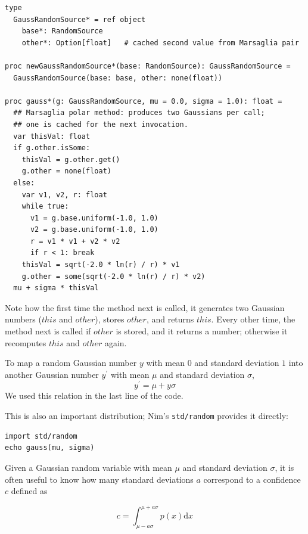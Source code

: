 \documentclass[justified, sixbynine]{tufte-book}
\def\ft{\small\tt}
\theoremstyle{plain}%
\newtheorem * {corollary}{Corollary}
\theoremstyle{definition}
\theoremstyle{remark}
\newtheorem * {remark}{Remark}
\newtheorem * {note}{Note}
\begin{document}
\begin{fullwidth}
\begin{lstlisting}[caption={in file: {\ft nlib/randomgen.nim}}]
type
  GaussRandomSource* = ref object
    base*: RandomSource
    other*: Option[float]   # cached second value from Marsaglia pair

proc newGaussRandomSource*(base: RandomSource): GaussRandomSource =
  GaussRandomSource(base: base, other: none(float))

proc gauss*(g: GaussRandomSource, mu = 0.0, sigma = 1.0): float =
  ## Marsaglia polar method: produces two Gaussians per call;
  ## one is cached for the next invocation.
  var thisVal: float
  if g.other.isSome:
    thisVal = g.other.get()
    g.other = none(float)
  else:
    var v1, v2, r: float
    while true:
      v1 = g.base.uniform(-1.0, 1.0)
      v2 = g.base.uniform(-1.0, 1.0)
      r = v1 * v1 + v2 * v2
      if r < 1: break
    thisVal = sqrt(-2.0 * ln(r) / r) * v1
    g.other = some(sqrt(-2.0 * ln(r) / r) * v2)
  mu + sigma * thisVal
\end{lstlisting}

Note how the first time the method next is called, it generates two Gaussian
numbers ($this$ and $other$), stores $other$, and returns $this$. Every other
time, the method next is called if $other$ is stored, and it returns a number;
otherwise it recomputes $this$ and $other$ again.

To map a random Gaussian number $y$ with mean $0$ and standard deviation $1$
into another Gaussian number $y^{\prime }$ with mean $\mu $ and standard
deviation $\sigma $, 
\begin{equation}
y^{\prime }=\mu +y\sigma
\end{equation}
We used this relation in the last line of the code.

This is also an important distribution; Nim's {\ft std/random} provides it directly:

\begin{lstlisting}
import std/random
echo gauss(mu, sigma)
\end{lstlisting}

Given a Gaussian random variable with mean $\mu$ and standard deviation $\sigma$, it is often useful to know how many standard deviations $a$ correspond to a confidence $c$ defined as

\begin{equation}
c = \int_{\mu-a\sigma}^{\mu+a\sigma} p(x)\textrm{d}x
\end{equation}


\end{fullwidth}
\end{document}
